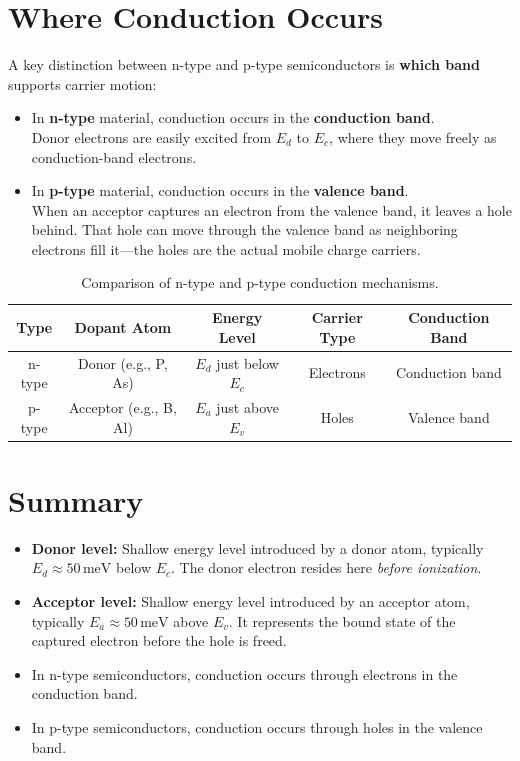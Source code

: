 \documentclass[12pt]{article}
\begin{document}
	\section{Where Conduction Occurs}
	A key distinction between n-type and p-type semiconductors is \textbf{which band} supports carrier motion:
	\begin{itemize}
		\item In \textbf{n-type} material, conduction occurs in the \textbf{conduction band}.\\
		Donor electrons are easily excited from \(E_d\) to \(E_c\), where they move freely as conduction-band electrons.
		\item In \textbf{p-type} material, conduction occurs in the \textbf{valence band}.\\
		When an acceptor captures an electron from the valence band, it leaves a hole behind. 
		That hole can move through the valence band as neighboring electrons fill it---the holes are the actual mobile charge carriers.
	\end{itemize}
	
	\begin{table}[h!]
		\centering
		\renewcommand{\arraystretch}{1.2}
		\begin{tabular}{|c|c|c|c|c|}
			\hline
			\textbf{Type} & \textbf{Dopant Atom} & \textbf{Energy Level} & \textbf{Carrier Type} & \textbf{Conduction Band} \\
			\hline
			n-type & Donor (e.g., P, As) & \(E_d\) just below \(E_c\) & Electrons & Conduction band \\
			\hline
			p-type & Acceptor (e.g., B, Al) & \(E_a\) just above \(E_v\) & Holes & Valence band \\
			\hline
		\end{tabular}
		\caption{Comparison of n-type and p-type conduction mechanisms.}
	\end{table}
	
	\section{Summary}
	\begin{itemize}
		\item \textbf{Donor level:} Shallow energy level introduced by a donor atom, typically \(E_d \approx 50\,\text{meV}\) below \(E_c\). The donor electron resides here \emph{before ionization}.
		\item \textbf{Acceptor level:} Shallow energy level introduced by an acceptor atom, typically \(E_a \approx 50\,\text{meV}\) above \(E_v\). It represents the bound state of the captured electron before the hole is freed.
		\item In n-type semiconductors, conduction occurs through electrons in the conduction band.
		\item In p-type semiconductors, conduction occurs through holes in the valence band.
	\end{itemize}
	
\end{document}
